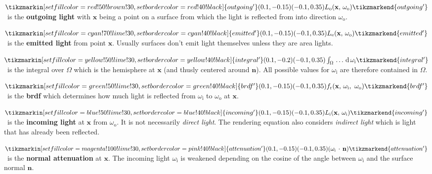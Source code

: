 \documentclass[
  twoside,
  11pt, a4paper,
  footinclude=true,
  headinclude=true,
  cleardoublepage=empty
]{scrreprt}
\begin{document}
\noindent
\(
        \tikzmarkin[set fill color=red!50!brown!30,set border color=red!40!black]{outgoing'}(0.1,-0.15)(-0.1,0.35)
        L_{\text{o}}(\mathbf x,\, \omega_{\text{o}})
        \tikzmarkend{outgoing'}
\)\, is the \textbf{outgoing light} with \(\mathbf x\) being a point on a surface from which the light is
reflected from into direction \(\omega_{\text{o}}\).

\noindent
\(
        \tikzmarkin[set fill color=cyan!70!lime!30,set border color=cyan!40!black]{emitted'}(0.1,-0.15)(-0.1,0.35)
        L_{\text{e}}(\mathbf x,\, \omega_{\text{o}})
        \tikzmarkend{emitted'}
\)\, is the \textbf{emitted light} from point \(\mathbf x\). Usually surfaces don't emit light themselves unless
they are area lights.

\noindent
\(
        \tikzmarkin[set fill color=yellow!50!lime!30,set border color=yellow!40!black]{integral'}(0.1,-0.2)(-0.1,0.35)
        \int_\Omega \, \ldots \, \operatorname d \omega_{\text{i}}
        \tikzmarkend{integral'}
\)\, is the integral over \(\Omega\) which is the hemisphere at \(\mathbf x\) (and thusly
centered around \(\mathbf n\)). All possible values for \(\omega_{\text{i}}\) are therefore
contained in \(\Omega\).

\noindent
\(
        \tikzmarkin[set fill color=green!50!lime!30,set border color=green!40!black]{brdf'}(0.1,-0.15)(-0.1,0.35)
            f_{\text{r}}(\mathbf x,\, \omega_{\text{i}},\ \omega_{\text{o}})
        \tikzmarkend{brdf'}
\)\, is the \textbf{\ac{brdf}} which determines how much light is reflected from
\(\omega_{\text{i}}\) to \(\omega_{\text{o}}\) at \(\mathbf x\).

\noindent
\(
        \tikzmarkin[set fill color=blue!50!lime!30,set border color=blue!40!black]{incoming'}(0.1,-0.15)(-0.1,0.35)
            L_{\text{i}}(\mathbf x,\, \omega_{\text{i}})
        \tikzmarkend{incoming'}
\)\, is the \textbf{incoming light} at \(\mathbf x\) from \(\omega_{\text{o}}\). It is not necessarily
\emph{direct light}. The rendering equation also considers \emph{indirect light} which is light that has already
been reflected.

\noindent
\(
        \tikzmarkin[set fill color=magenta!100!lime!30,set border color=pink!40!black]{attenuation'}(0.1,-0.15)(-0.1,0.35)
            (\omega_{\text{i}}\,\cdot\,\mathbf n)
        \tikzmarkend{attenuation'}
\)\, is the \textbf{normal attenuation} at \(\mathbf x\). The incoming light \(\omega_{\text{i}}\) is
weakened depending on the cosine of the angle between \(\omega_{\text{i}}\) and the surface normal
\(\mathbf n\).
\end{document}
